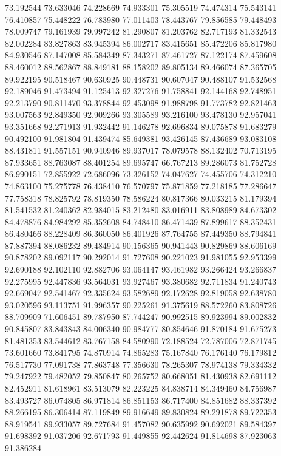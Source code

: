 73.192544
73.633046
74.228669
74.933301
75.305519
74.474314
75.543141
76.410857
75.448222
76.783980
77.011403
78.443767
79.856585
79.448493
78.009747
79.161939
79.997242
81.290807
81.203762
82.717193
81.332543
82.002284
83.827863
83.945394
86.002717
83.415651
85.472206
85.817980
84.930546
87.147008
85.584349
87.343271
87.461727
87.122174
87.459608
88.460012
88.562867
88.849181
88.158202
89.805134
89.466074
87.365705
89.922195
90.518467
90.630925
90.448731
90.607047
90.488107
91.532568
92.189046
91.473494
91.125413
92.327276
91.758841
92.144168
92.748951
92.213790
90.811470
93.378844
92.453098
91.988798
91.773782
92.821463
93.007563
92.849350
92.909266
93.305589
93.216100
93.478130
92.957041
93.351668
92.271913
91.932442
91.146278
92.696834
89.075878
91.683279
90.492100
91.981804
91.439474
85.649381
93.426145
87.436689
93.083108
88.431811
91.557151
90.940946
89.937017
78.079578
88.132402
70.713195
87.933651
88.763087
88.401254
89.695747
66.767213
89.286073
81.752728
86.990151
72.855922
72.686096
73.326152
74.047627
74.455706
74.312210
74.863100
75.275778
76.438410
76.570797
75.871859
77.218185
77.286647
77.758318
78.825792
78.819350
78.586224
80.817366
80.033215
81.179394
81.541532
81.240362
82.984015
83.212480
83.016911
83.808989
84.673302
84.478876
84.984292
85.352608
84.748410
86.471439
87.899617
88.352431
86.480466
88.228409
86.360050
86.401926
87.764755
87.449350
88.794841
87.887394
88.086232
89.484914
90.156365
90.941443
90.829869
88.606169
90.878202
89.092117
90.292014
91.727608
90.221023
91.981055
92.953399
92.690188
92.102110
92.882706
93.064147
93.461982
93.266424
93.266837
92.275995
92.447836
93.564031
93.927467
93.380682
92.711834
91.240743
92.669047
92.541467
92.335624
93.582689
92.172628
92.819058
92.638780
93.020596
93.113751
91.996357
90.225261
91.375619
88.572260
83.808726
88.709909
71.606451
89.787950
87.744247
90.992515
89.923994
89.002832
90.845807
83.843843
84.006340
90.984777
80.854646
91.870184
91.675273
81.481353
83.544612
83.767158
84.580990
72.188524
72.787006
72.871745
73.601660
73.841795
74.870914
74.865283
75.167840
76.176140
76.179812
76.517730
77.091738
77.863748
77.356630
78.265307
78.974138
79.334332
79.247922
79.482052
79.850847
80.265752
80.668051
81.430938
82.691112
82.452911
81.618961
83.513079
82.223225
84.838714
84.349460
84.756987
83.493727
86.074805
86.971814
86.851153
86.717400
84.851682
88.337392
88.266195
86.306414
87.119849
89.916649
89.830824
89.291878
89.722353
88.919541
89.933057
89.727684
91.457082
90.635992
90.692021
89.584397
91.698392
91.037206
92.671793
91.449855
92.442624
91.814698
87.923063
91.386284
